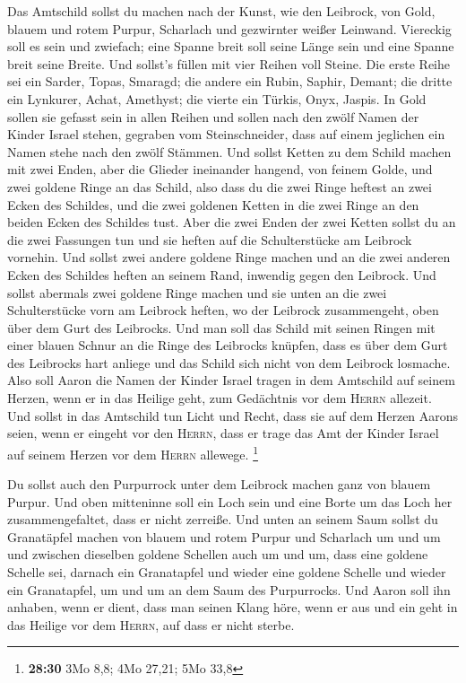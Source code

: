  Das Amtschild sollst du machen nach der Kunst, wie den
Leibrock, von Gold, blauem und rotem Purpur, Scharlach und gezwirnter
weißer Leinwand.  Viereckig soll es sein und zwiefach;
eine Spanne breit soll seine Länge sein und eine Spanne breit seine
Breite.  Und sollst's füllen mit vier Reihen voll Steine.
Die erste Reihe sei ein Sarder, Topas, Smaragd;  die
andere ein Rubin, Saphir, Demant;  die dritte ein
Lynkurer, Achat, Amethyst;  die vierte ein Türkis, Onyx,
Jaspis. In Gold sollen sie gefasst sein in allen Reihen 
und sollen nach den zwölf Namen der Kinder Israel stehen, gegraben vom
Steinschneider, dass auf einem jeglichen ein Namen stehe nach den zwölf
Stämmen.  Und sollst Ketten zu dem Schild machen mit zwei
Enden, aber die Glieder ineinander hangend, von feinem Golde,
 und zwei goldene Ringe an das Schild, also dass du die
zwei Ringe heftest an zwei Ecken des Schildes,  und die
zwei goldenen Ketten in die zwei Ringe an den beiden Ecken des Schildes
tust.  Aber die zwei Enden der zwei Ketten sollst du an
die zwei Fassungen tun und sie heften auf die Schulterstücke am Leibrock
vornehin.  Und sollst zwei andere goldene Ringe machen
und an die zwei anderen Ecken des Schildes heften an seinem Rand,
inwendig gegen den Leibrock.  Und sollst abermals zwei
goldene Ringe machen und sie unten an die zwei Schulterstücke vorn am
Leibrock heften, wo der Leibrock zusammengeht, oben über dem Gurt des
Leibrocks.  Und man soll das Schild mit seinen Ringen mit
einer blauen Schnur an die Ringe des Leibrocks knüpfen, dass es über dem
Gurt des Leibrocks hart anliege und das Schild sich nicht von dem
Leibrock losmache.  Also soll Aaron die Namen der Kinder
Israel tragen in dem Amtschild auf seinem Herzen, wenn er in das Heilige
geht, zum Gedächtnis vor dem \textsc{Herrn} allezeit. 
Und sollst in das Amtschild tun Licht und Recht, dass sie auf dem Herzen
Aarons seien, wenn er eingeht vor den \textsc{Herrn}, dass er trage das
Amt der Kinder Israel auf seinem Herzen vor dem \textsc{Herrn} allewege.
\footnote{\textbf{28:30} 3Mo 8,8; 4Mo 27,21; 5Mo 33,8}

 Du sollst auch den Purpurrock unter dem Leibrock machen
ganz von blauem Purpur.  Und oben mitteninne soll ein
Loch sein und eine Borte um das Loch her zusammengefaltet, dass er nicht
zerreiße.  Und unten an seinem Saum sollst du Granatäpfel
machen von blauem und rotem Purpur und Scharlach um und um und zwischen
dieselben goldene Schellen auch um und um,  dass eine
goldene Schelle sei, darnach ein Granatapfel und wieder eine goldene
Schelle und wieder ein Granatapfel, um und um an dem Saum des
Purpurrocks.  Und Aaron soll ihn anhaben, wenn er dient,
dass man seinen Klang höre, wenn er aus und ein geht in das Heilige vor
dem \textsc{Herrn}, auf dass er nicht sterbe.


